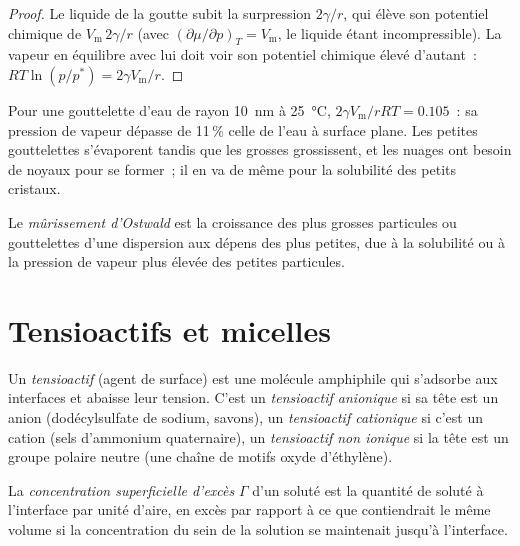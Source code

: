 \begin{proof}
Le liquide de la goutte subit la surpression $2\gamma/r$, qui élève son
potentiel chimique de $V_{\mathrm m}\,2\gamma/r$ (avec
$(\partial\mu/\partial p)_T = V_{\mathrm m}$, le liquide étant
incompressible). La vapeur en équilibre avec lui doit voir son potentiel
chimique élevé d'autant~: $RT\ln(p/p^*) = 2\gamma V_{\mathrm m}/r$.
\end{proof}

Pour une gouttelette d'eau de rayon \qty{10}{nm} à \qty{25}{\celsius},
$2\gamma V_{\mathrm m}/rRT = 0.105$~: sa pression de vapeur
dépasse de 11\,\% celle de l'eau à surface plane. Les petites
gouttelettes s'évaporent tandis que les grosses grossissent, et les
nuages ont besoin de noyaux pour se former~; il en va de même pour la
solubilité des petits cristaux.

\begin{definition}\label{def:b3:colloids:ripening}
Le \emph{mûrissement d'Ostwald} est la croissance des
plus grosses particules ou gouttelettes d'une dispersion aux dépens des
plus petites, due à la solubilité ou à la pression de vapeur plus élevée
des petites particules.
\end{definition}

\section{Tensioactifs et micelles}

\begin{definition}[Tensioactif]\label{def:b3:colloids:surfactant}
Un \emph{tensioactif} (agent de surface) est une
molécule amphiphile qui s'adsorbe aux interfaces et abaisse leur
tension. C'est un
\emph{tensioactif anionique} si sa tête est
un anion (dodécylsulfate de sodium, savons), un \emph{tensioactif
cationique}
si c'est un cation (sels d'ammonium quaternaire), un \emph{tensioactif
non ionique} si la tête est un groupe
polaire neutre (une chaîne de motifs oxyde d'éthylène).
\end{definition}

\begin{definition}\label{def:b3:colloids:surface-excess}
La \emph{concentration superficielle d'excès} $\Gamma$ d'un
soluté est la quantité de soluté à l'interface par unité d'aire, en
excès par rapport à ce que contiendrait le même volume si la
concentration du sein de la solution se maintenait jusqu'à l'interface.
\end{definition}


